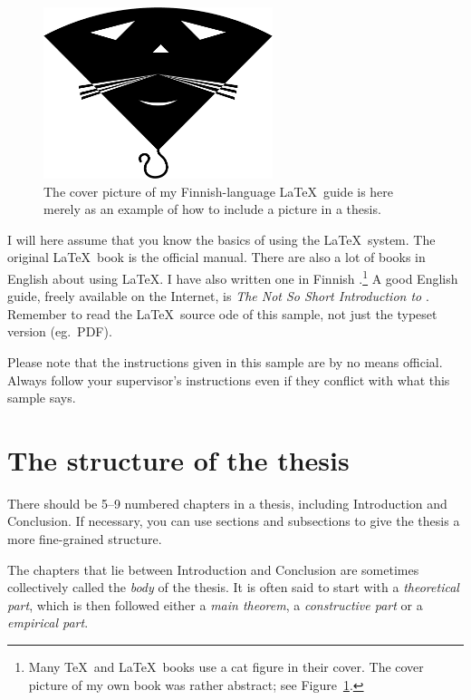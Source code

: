 \documentclass[utf8,english]{gradu3}
\begin{document}
\begin{figure}[h]\centering
  \includegraphics[height=5cm,keepaspectratio]{opus-kissa}
  \caption[The cover picture of my Finnish-language \LaTeX\ guide
  \parencite{kaijanaho03:_latex_ams_latex}]{The cover picture of my
    Finnish-language \LaTeX\
    guide \parencite{kaijanaho03:_latex_ams_latex} is here merely as
    an example of how to include a picture in a thesis.}
  \label{fig:opus-kissa}
\end{figure}

I will here assume that you know the basics of using the \LaTeX\
system.  The original \LaTeX\ book \parencite{lamport94:_latex} is the
official manual.  There are also a lot of books in English about using
\LaTeX.  I have also written one in
Finnish \parencite{kaijanaho03:_latex_ams_latex}.\footnote{Many \TeX\
  and \LaTeX\ books use a cat figure in their cover.  The cover
  picture of my own book was rather abstract; see
  Figure~\ref{fig:opus-kissa}.}  A good English guide, freely
available on the Internet, is \textit{The Not So Short Introduction to
  \LaTeXe} \parencite{oetiker:_not_so_short_introd_latex}.  Remember
to read the \LaTeX\ source ode of this sample, not just the typeset
version (eg.~PDF).

Please note that the instructions given in this sample are by no means
official.  Always follow your supervisor's instructions even if they
conflict with what this sample says.


\chapter{The structure of the thesis}

There should be 5--9 numbered chapters in a thesis, including
Introduction and Conclusion.  If necessary, you can use sections
and subsections to give the thesis a more fine-grained structure.

The chapters that lie between Introduction and Conclusion are
sometimes collectively called the \textit{body} of the thesis.  It is
often said to start with a \textit{theoretical part}, which is then
followed either a \textit{main theorem}, a \textit{constructive part}
or a \textit{empirical part}.
\end{document}

